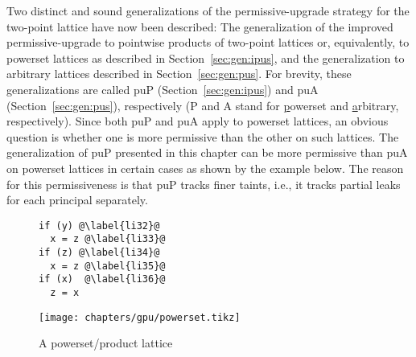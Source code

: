 Two distinct and sound generalizations of the permissive-upgrade
strategy for the two-point lattice have now been described:
The generalization of the improved permissive-upgrade to pointwise
products of two-point lattices or, equivalently, to powerset lattices
as described in Section~\ref{sec:gen:ipus}, and the generalization to
arbitrary lattices described in Section~\ref{sec:gen:pus}. For brevity,
these generalizations are called puP (Section~\ref{sec:gen:ipus}) and
puA (Section~\ref{sec:gen:pus}), 
respectively (P and A stand for \underline{p}owerset and
\underline{a}rbitrary, respectively). Since both puP and puA apply to
powerset lattices, an obvious question is whether one is more
permissive than the other on such lattices. The generalization of puP
presented in this chapter can be more permissive than puA on powerset 
lattices in certain cases as shown by the example
below. The reason for this permissiveness is that puP tracks finer
taints, i.e., it tracks partial leaks for each principal separately. 


\begin{figure}[ht]
\begin{minipage}{0.65\linewidth}
\centering
\begin{lstlisting}[caption=Example where puP is more permissive than puA,label=list3]
if (y) @\label{li32}@
  x = z @\label{li33}@
if (z) @\label{li34}@
  x = z @\label{li35}@
if (x)  @\label{li36}@
  z = x
\end{lstlisting}
\end{minipage}
\hspace{-1.5cm}
\begin{minipage}{0.45\linewidth}
\centering
{\texttt{[image: chapters/gpu/powerset.tikz]}}
\caption{A powerset/product lattice}\label{fig:lattice1}
\end{minipage}
\end{figure}

